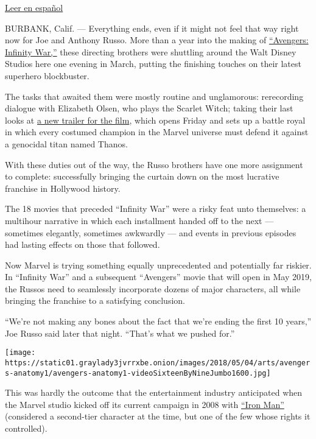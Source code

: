 \href{https://www.nytimes3xbfgragh.onion/es/2018/04/23/avengers-infinity-war/}{Leer
en español}

BURBANK, Calif. --- Everything ends, even if it might not feel that way
right now for Joe and Anthony Russo. More than a year into the making of
\href{http://marvel.com/movies/movie/223/avengers_infinity_war}{``Avengers:
Infinity War,''} these directing brothers were shuttling around the Walt
Disney Studios here one evening in March, putting the finishing touches
on their latest superhero blockbuster.

The tasks that awaited them were mostly routine and unglamorous:
rerecording dialogue with Elizabeth Olsen, who plays the Scarlet Witch;
taking their last looks at
\href{https://www.youtube.com/watch?v=QwievZ1Tx-8}{a new trailer for the
film}, which opens Friday and sets up a battle royal in which every
costumed champion in the Marvel universe must defend it against a
genocidal titan named Thanos.

With these duties out of the way, the Russo brothers have one more
assignment to complete: successfully bringing the curtain down on the
most lucrative franchise in Hollywood history.

The 18 movies that preceded ``Infinity War'' were a risky feat unto
themselves: a multihour narrative in which each installment handed off
to the next --- sometimes elegantly, sometimes awkwardly --- and events
in previous episodes had lasting effects on those that followed.

Now Marvel is trying something equally unprecedented and potentially far
riskier. In ``Infinity War'' and a subsequent ``Avengers'' movie that
will open in May 2019, the Russos need to seamlessly incorporate dozens
of major characters, all while bringing the franchise to a satisfying
conclusion.

``We're not making any bones about the fact that we're ending the first
10 years,'' Joe Russo said later that night. ``That's what we pushed
for.''

\texttt{[image: https://static01.graylady3jvrrxbe.onion/images/2018/05/04/arts/avengers-anatomy1/avengers-anatomy1-videoSixteenByNineJumbo1600.jpg]}

This was hardly the outcome that the entertainment industry anticipated
when the Marvel studio kicked off its current campaign in 2008 with
\href{https://www.youtube.com/watch?v=FRIUhO4MdGU}{``Iron Man''}
(considered a second-tier character at the time, but one of the few
whose rights it controlled).

